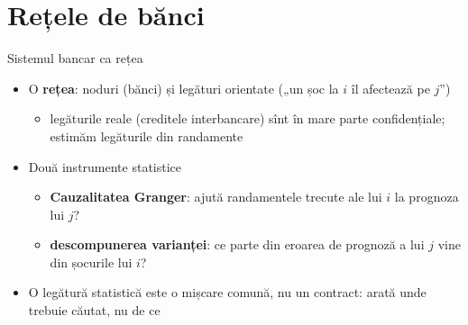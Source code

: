\section{Rețele de bănci}

\begin{frame}{Sistemul bancar ca rețea}
\itemsize{\small}
\begin{itemize}
    \item O \textbf{rețea}: noduri (bănci) și legături orientate („un șoc la $i$ îl afectează pe $j$”)
    \begin{itemize}
        \item legăturile reale (creditele interbancare) sînt în mare parte confidențiale; estimăm legăturile din randamente
    \end{itemize}
    \item Două instrumente statistice
    \begin{itemize}
        \item \textbf{Cauzalitatea Granger}: ajută randamentele trecute ale lui $i$ la prognoza lui $j$? 
        \item \textbf{descompunerea varianței}: ce parte din eroarea de prognoză a lui $j$ vine din șocurile lui $i$? 
    \end{itemize}
    \item O legătură statistică este o mișcare comună, nu un contract: arată unde trebuie căutat, nu de ce
\end{itemize}
\end{frame}

